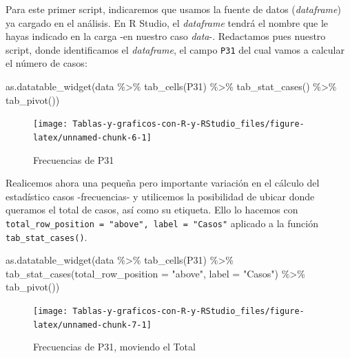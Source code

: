 \documentclass[
]{book}
\newenvironment{Shaded}{\begin{snugshade}}{\end{snugshade}}
\newcommand{\AttributeTok}[1]{\textcolor[rgb]{0.77,0.63,0.00}{#1}}
\newcommand{\FunctionTok}[1]{\textcolor[rgb]{0.00,0.00,0.00}{#1}}
\newcommand{\NormalTok}[1]{#1}
\newcommand{\SpecialCharTok}[1]{\textcolor[rgb]{0.00,0.00,0.00}{#1}}
\newcommand{\StringTok}[1]{\textcolor[rgb]{0.31,0.60,0.02}{#1}}
\begin{document}
Para este primer script, indicaremos que usamos la fuente de datos (\emph{dataframe}) ya cargado en el análisis. En R Studio, el \emph{dataframe} tendrá el nombre que le hayas indicado en la carga -en nuestro caso \emph{data}-. Redactamos pues nuestro script, donde identificamos el \emph{dataframe}, el campo \texttt{P31} del cual vamos a calcular el número de casos:

\begin{Shaded}
\begin{Highlighting}[]
\FunctionTok{as.datatable\_widget}\NormalTok{(data }\SpecialCharTok{\%\textgreater{}\%}
  \FunctionTok{tab\_cells}\NormalTok{(P31) }\SpecialCharTok{\%\textgreater{}\%}
  \FunctionTok{tab\_stat\_cases}\NormalTok{() }\SpecialCharTok{\%\textgreater{}\%}
  \FunctionTok{tab\_pivot}\NormalTok{())}
\end{Highlighting}
\end{Shaded}

\begin{figure}[H]

{\centering \texttt{[image: Tablas-y-graficos-con-R-y-RStudio\_files/figure-latex/unnamed-chunk-6-1]} 

}

\caption{Frecuencias de P31}\label{fig:unnamed-chunk-6}
\end{figure}

Realicemos ahora una pequeña pero importante variación en el cálculo del estadístico casos -frecuencias- y utilicemos la posibilidad de ubicar donde queramos el total de casos, así como su etiqueta. Ello lo hacemos con \texttt{total\_row\_position\ =\ "above",\ label\ =\ "Casos"} aplicado a la función \texttt{tab\_stat\_cases()}.

\begin{Shaded}
\begin{Highlighting}[]
\FunctionTok{as.datatable\_widget}\NormalTok{(data }\SpecialCharTok{\%\textgreater{}\%}
  \FunctionTok{tab\_cells}\NormalTok{(P31) }\SpecialCharTok{\%\textgreater{}\%}
  \FunctionTok{tab\_stat\_cases}\NormalTok{(}\AttributeTok{total\_row\_position =} \StringTok{"above"}\NormalTok{, }\AttributeTok{label =} \StringTok{"Casos"}\NormalTok{) }\SpecialCharTok{\%\textgreater{}\%}
  \FunctionTok{tab\_pivot}\NormalTok{())}
\end{Highlighting}
\end{Shaded}

\begin{figure}[H]

{\centering \texttt{[image: Tablas-y-graficos-con-R-y-RStudio\_files/figure-latex/unnamed-chunk-7-1]} 

}

\caption{Frecuencias de P31, moviendo el Total}\label{fig:unnamed-chunk-7}
\end{figure}
\end{document}
